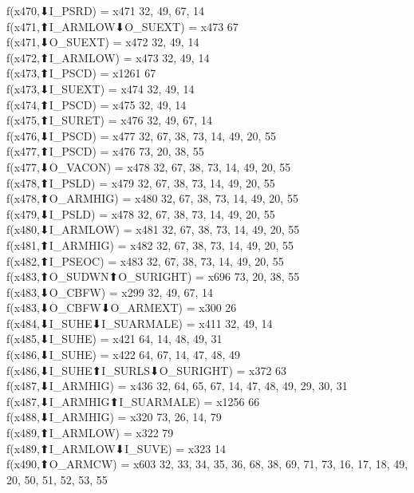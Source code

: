 f(x470,⬇I_PSRD) = x471 {32, 49, 67, 14} \\
f(x471,⬆I_ARMLOW⬇O_SUEXT) = x473 {67} \\
f(x471,⬇O_SUEXT) = x472 {32, 49, 14} \\
f(x472,⬆I_ARMLOW) = x473 {32, 49, 14} \\
f(x473,⬆I_PSCD) = x1261 {67} \\
f(x473,⬇I_SUEXT) = x474 {32, 49, 14} \\
f(x474,⬆I_PSCD) = x475 {32, 49, 14} \\
f(x475,⬆I_SURET) = x476 {32, 49, 67, 14} \\
f(x476,⬇I_PSCD) = x477 {32, 67, 38, 73, 14, 49, 20, 55} \\
f(x477,⬆I_PSCD) = x476 {73, 20, 38, 55} \\
f(x477,⬇O_VACON) = x478 {32, 67, 38, 73, 14, 49, 20, 55} \\
f(x478,⬆I_PSLD) = x479 {32, 67, 38, 73, 14, 49, 20, 55} \\
f(x478,⬆O_ARMHIG) = x480 {32, 67, 38, 73, 14, 49, 20, 55} \\
f(x479,⬇I_PSLD) = x478 {32, 67, 38, 73, 14, 49, 20, 55} \\
f(x480,⬇I_ARMLOW) = x481 {32, 67, 38, 73, 14, 49, 20, 55} \\
f(x481,⬆I_ARMHIG) = x482 {32, 67, 38, 73, 14, 49, 20, 55} \\
f(x482,⬆I_PSEOC) = x483 {32, 67, 38, 73, 14, 49, 20, 55} \\
f(x483,⬆O_SUDWN⬆O_SURIGHT) = x696 {73, 20, 38, 55} \\
f(x483,⬇O_CBFW) = x299 {32, 49, 67, 14} \\
f(x483,⬇O_CBFW⬇O_ARMEXT) = x300 {26} \\
f(x484,⬇I_SUHE⬇I_SUARMALE) = x411 {32, 49, 14} \\
f(x485,⬇I_SUHE) = x421 {64, 14, 48, 49, 31} \\
f(x486,⬇I_SUHE) = x422 {64, 67, 14, 47, 48, 49} \\
f(x486,⬇I_SUHE⬆I_SURLS⬇O_SURIGHT) = x372 {63} \\
f(x487,⬇I_ARMHIG) = x436 {32, 64, 65, 67, 14, 47, 48, 49, 29, 30, 31} \\
f(x487,⬇I_ARMHIG⬆I_SUARMALE) = x1256 {66} \\
f(x488,⬇I_ARMHIG) = x320 {73, 26, 14, 79} \\
f(x489,⬆I_ARMLOW) = x322 {79} \\
f(x489,⬆I_ARMLOW⬇I_SUVE) = x323 {14} \\
f(x490,⬆O_ARMCW) = x603 {32, 33, 34, 35, 36, 68, 38, 69, 71, 73, 16, 17, 18, 49, 20, 50, 51, 52, 53, 55} \\
